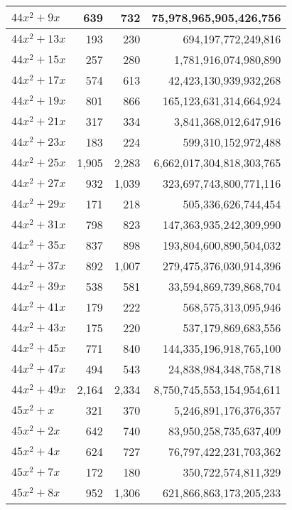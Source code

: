\documentclass[a4paper]{amsproc}
\theoremstyle{plain}
\begin{document}
\begin{longtable}{ | l | r | r | r | }
$44x^2 + 9x$ & 639 & 732 & 75{,}978{,}965{,}905{,}426{,}756 \\ \hline
$44x^2 + 13x$ & 193 & 230 & 694{,}197{,}772{,}249{,}816 \\ \hline
$44x^2 + 15x$ & 257 & 280 & 1{,}781{,}916{,}074{,}980{,}890 \\ \hline
$44x^2 + 17x$ & 574 & 613 & 42{,}423{,}130{,}939{,}932{,}268 \\ \hline
$44x^2 + 19x$ & 801 & 866 & 165{,}123{,}631{,}314{,}664{,}924 \\ \hline
$44x^2 + 21x$ & 317 & 334 & 3{,}841{,}368{,}012{,}647{,}916 \\ \hline
$44x^2 + 23x$ & 183 & 224 & 599{,}310{,}152{,}972{,}488 \\ \hline
$44x^2 + 25x$ & 1{,}905 & 2{,}283 & 6{,}662{,}017{,}304{,}818{,}303{,}765 \\ \hline
$44x^2 + 27x$ & 932 & 1{,}039 & 323{,}697{,}743{,}800{,}771{,}116 \\ \hline
$44x^2 + 29x$ & 171 & 218 & 505{,}336{,}626{,}744{,}454 \\ \hline
$44x^2 + 31x$ & 798 & 823 & 147{,}363{,}935{,}242{,}309{,}990 \\ \hline
$44x^2 + 35x$ & 837 & 898 & 193{,}804{,}600{,}890{,}504{,}032 \\ \hline
$44x^2 + 37x$ & 892 & 1{,}007 & 279{,}475{,}376{,}030{,}914{,}396 \\ \hline
$44x^2 + 39x$ & 538 & 581 & 33{,}594{,}869{,}739{,}868{,}704 \\ \hline
$44x^2 + 41x$ & 179 & 222 & 568{,}575{,}313{,}095{,}946 \\ \hline
$44x^2 + 43x$ & 175 & 220 & 537{,}179{,}869{,}683{,}556 \\ \hline
$44x^2 + 45x$ & 771 & 840 & 144{,}335{,}196{,}918{,}765{,}100 \\ \hline
$44x^2 + 47x$ & 494 & 543 & 24{,}838{,}984{,}348{,}758{,}718 \\ \hline
$44x^2 + 49x$ & 2{,}164 & 2{,}334 & 8{,}750{,}745{,}553{,}154{,}954{,}611 \\ \hline
$45x^2 + x$ & 321 & 370 & 5{,}246{,}891{,}176{,}376{,}357 \\ \hline
$45x^2 + 2x$ & 642 & 740 & 83{,}950{,}258{,}735{,}637{,}409 \\ \hline
$45x^2 + 4x$ & 624 & 727 & 76{,}797{,}422{,}231{,}703{,}362 \\ \hline
$45x^2 + 7x$ & 172 & 180 & 350{,}722{,}574{,}811{,}329 \\ \hline
$45x^2 + 8x$ & 952 & 1{,}306 & 621{,}866{,}863{,}173{,}205{,}233 \\ \hline

\end{longtable}
\end{document}
